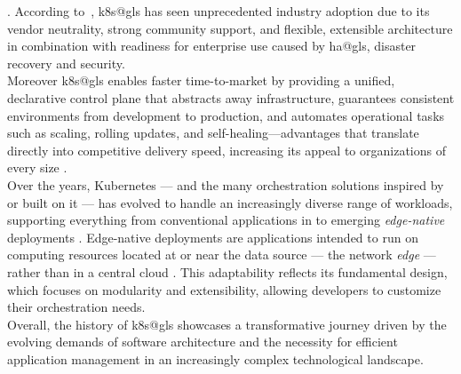 \documentclass[11pt, a4paper, oneside, listof=totoc]{scrartcl}
\begin{document}
                \parencite[p.~27]{redhatStateOfK8sSecurityReport2024}.
                According to~\cite[pp.~855--856]{damarapati2025}, \gls{k8s@gls} has seen
                unprecedented industry adoption due to its vendor neutrality, strong community
                support, and flexible, extensible architecture in combination with readiness for
                enterprise use caused by \gls{ha@gls}, disaster recovery and security.
                \\
                Moreover \gls{k8s@gls} enables faster time-to-market by providing a unified,
                declarative control plane that abstracts away infrastructure,
                guarantees consistent environments from development to production,
                and automates operational tasks such as scaling, rolling updates,
                and self-healing—advantages that translate directly into competitive delivery speed,
                increasing its appeal to organizations of every size
                \parencite[pp.~858--859]{damarapati2025}.
                \\
                Over the years, Kubernetes --- and the many orchestration solutions inspired by or
                built on it --- has evolved to handle an increasingly diverse range of workloads,
                supporting everything from conventional applications in to emerging
                \textit{edge-native} deployments \parencites[p.~21]{biot2025}[pp.~1--4]{biot2025}.
                Edge-native deployments are applications intended to run on computing
                resources located at or near the data source --- the network \textit{edge} ---
                rather than in a central cloud \parencite[p.~34]{satyanarayanan2019}.
                This adaptability reflects its fundamental design, which focuses on modularity and
                extensibility, allowing developers to customize their orchestration needs.
                \\
                Overall, the history of \gls{k8s@gls} showcases a transformative journey driven by the
                evolving demands of software architecture and the necessity for efficient
                application management in an increasingly complex technological landscape.
\end{document}
